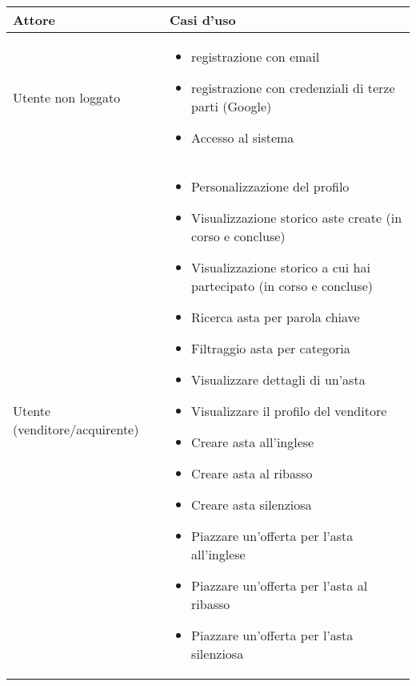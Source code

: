{
	\setlength{\tabcolsep}{10pt} %
	\renewcommand{\arraystretch}{1.5} %

	\begin{tabular}{|l|p{330pt}|}
		\hline
		\textbf{Attore}               & \textbf{Casi d'uso}                                        \\ \hline
		Utente non loggato            & \begin{itemize}[leftmargin=15pt]
			                                \setlength{\itemsep}{0pt}  %
			                                \setlength{\parskip}{0pt}  %
			                                \item registrazione con email
			                                \item registrazione con credenziali di terze parti (Google)
			                                \item Accesso al sistema
		                                \end{itemize} \\ \hline
		Utente (venditore/acquirente) & 
		\begin{itemize}[leftmargin=15pt]
			\setlength{\itemsep}{0pt}  %
			\setlength{\parskip}{0pt}  %
			\item Personalizzazione del profilo
			\item Visualizzazione storico aste create (in corso e concluse)
			\item Visualizzazione storico a cui hai partecipato (in corso e concluse)
			\item Ricerca asta per parola chiave
			\item Filtraggio asta per categoria
			\item Visualizzare dettagli di un'asta
			\item Visualizzare il profilo del venditore

		\end{itemize}\medskip
		\begin{itemize}[leftmargin=15pt]
			\setlength{\itemsep}{0pt}  %
			\setlength{\parskip}{0pt}  %
			\item Creare asta all'inglese
			\item Creare asta al ribasso
			\item Creare asta silenziosa
		\end{itemize}\medskip
		\begin{itemize}[leftmargin=15pt]
			\setlength{\itemsep}{0pt}  %
			\setlength{\parskip}{0pt}  %
			\item Piazzare un'offerta per l'asta all'inglese
			\item Piazzare un'offerta per l'asta al ribasso
			\item Piazzare un'offerta per l'asta silenziosa
		\end{itemize}                                \\ \hline
	\end{tabular}
}

